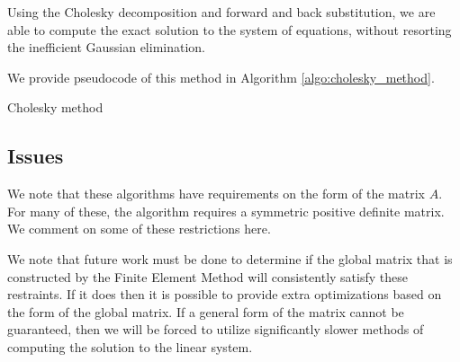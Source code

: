 \documentclass[../fem.tex]{subfiles}
\begin{document}
Using the Cholesky decomposition and forward and back substitution, we are able
to compute the exact solution to the system of equations, without resorting the
inefficient Gaussian elimination.

We provide pseudocode of this method in Algorithm \ref{algo:cholesky_method}.

\begin{algorithm}[H]
  \caption{Cholesky method}\label{algo:cholesky_method}
  \begin{algorithmic}
    \State{}
      \EndFor
        \EndFor
      \EndFor
    \EndFor
    \State{}
      \EndFor
    \EndFor
    \State{}
      \EndFor
    \EndFor
  \end{algorithmic}
\end{algorithm}

\subsection{Issues}%
\label{sub:issues}

We note that these algorithms have requirements on the form of the matrix $A$.
For many of these, the algorithm requires a symmetric positive definite matrix.
We comment on some of these restrictions here.

We note that future work must be done to determine if the global matrix that is
constructed by the Finite Element Method will consistently satisfy these
restraints. If it does then it is possible to provide extra optimizations based
on the form of the global matrix. If a general form of the matrix cannot be
guaranteed, then we will be forced to utilize significantly slower methods of
computing the solution to the linear system.
\end{document}
